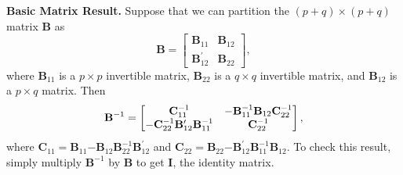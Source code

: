 \textbf{Basic Matrix Result.} Suppose that we can partition the $(p+q)\times
(p+q)$ matrix $\mathbf{B}$ as
\begin{equation*}
\mathbf{B}=%
\begin{bmatrix}
\mathbf{B}_{11} & \mathbf{B}_{12} \\
\mathbf{B}_{12}^{\prime } & \mathbf{B}_{22}%
\end{bmatrix},
\end{equation*}
where $\mathbf{B}_{11}$ is a $p\times p$ invertible matrix,
$\mathbf{B}_{22}$ is a $q\times q$ invertible matrix, and
$\mathbf{B}_{12}$ is a $p\times q$ matrix. Then
\begin{equation}\label{E5:PartitionMatrixInverse}
\mathbf{B}^{-1}=%
\begin{bmatrix}
\mathbf{C}_{11}^{-1} & \mathbf{-B}_{11}^{-1}\mathbf{B}_{12}\mathbf{C}%
_{22}^{-1} \\
\mathbf{-C}_{22}^{-1}\mathbf{B}_{12}^{\prime }\mathbf{B}_{11}^{-1} & \mathbf{%
C}_{22}^{-1}%
\end{bmatrix},
\end{equation}
where $\mathbf{C}_{11}=\mathbf{B}_{11}\mathbf{-B}_{12}\mathbf{B}_{22}^{-1}%
\mathbf{B}_{12}^{\prime }$ and $\mathbf{C}_{22}=\mathbf{B}_{22}\mathbf{-B}%
_{12}^{\prime }\mathbf{B}_{11}^{-1}\mathbf{B}_{12}$. To check this result,
simply multiply $\mathbf{B}^{-1}$ by $\mathbf{B}$ to get $\mathbf{I}$, the
identity matrix.

